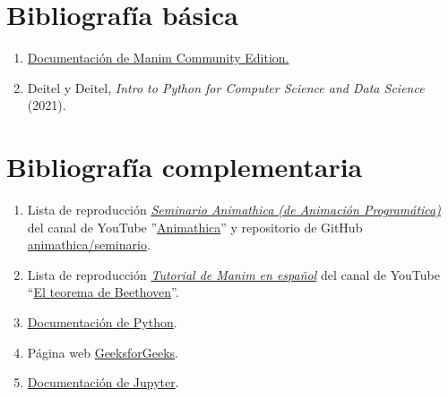 \documentclass[a4paper]{article}
\begin{document}
\section*{Bibliografía básica} \label{Sec: Bibliografía básica}

\begin{enumerate}

    \item \href{https://docs.manim.community/en/stable/index.html}{Documentación de Manim Community Edition.}


    \item Deitel y Deitel,  \emph{Intro to Python for Computer Science and Data Science} (2021).
\end{enumerate}

\section*{Bibliografía complementaria} \label{Sec: Bibliografía complementaria}

\begin{enumerate}

\item Lista de reproducción \href{https://www.youtube.com/watch?v=-VJ7h8-GbHU&list=PL91agCMqt_mfPlTgR8zmguMZIpGV0Jflj&ab_channel=Animathica}{\emph{Seminario Animathica (de Animación Programática)}} del canal de YouTube ''\href{https://www.youtube.com/channel/UCzkyH2bxpesubzc87VxqDiA}{Animathica}'' y repositorio de GitHub \href{https://github.com/animathica/seminario}{animathica/seminario}.

\item Lista de reproducción \href{https://www.youtube.com/playlist?list=PLcjmqHFN9VeMC9znnNiRMv3nqZv-bU9Fo}{\emph{Tutorial de Manim en español}} del canal de YouTube ``\href{https://www.youtube.com/channel/UCmFww1CGIFsvujZ0zNzcLQw}{El teorema de Beethoven}''.

    \item \href{https://www.python.org/doc/}{Documentación de Python}.

    \item Página web \href{https://www.geeksforgeeks.org/python-programming-language/}{GeeksforGeeks}.

    \item \href{https://docs.jupyter.org/en/latest/}{Documentación de Jupyter}.
\end{enumerate}
\end{document}
